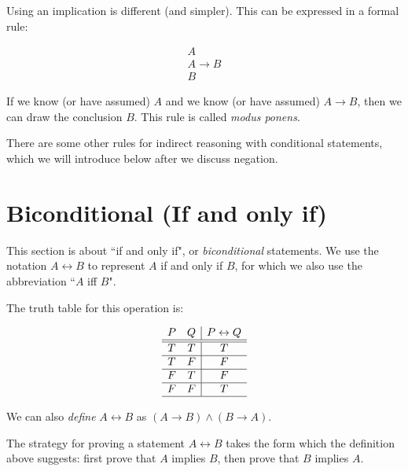 \documentclass[12pt]{article}
\begin{document}
Using an implication is different (and simpler).  This can be expressed in a formal rule:


$$\begin{array}{c}

A \\

A \rightarrow B \\ \hline

B

\end{array}$$


If we know (or have assumed) $A$ and we know (or have assumed) $A \rightarrow B$, then we can draw the conclusion $B$.  This rule is called {\em modus ponens\/}.

There are some other rules for indirect reasoning with conditional statements, which we will introduce below after we discuss negation.

\newpage

\section{Biconditional (If and only if)}

This section is about ``if and only if", or {\em biconditional\/} statements.  We use the notation $A \leftrightarrow B$ to represent $A$ if and only if $B$, for which we also use the abbreviation ``$A$ iff $B$".

The truth table for this operation is:

$$\begin{array}{cc|c}

P & Q & P \leftrightarrow Q \\ \hline \hline

T & T & T \\ \hline
T & F & F \\ \hline
F & T & F \\ \hline
F & F & T \\ \hline

\end{array}$$

We can also {\em define\/} $A \leftrightarrow B$ as $(A \rightarrow B) \wedge (B \rightarrow A)$.

The strategy for proving a statement $A \leftrightarrow B$ takes the form which the definition above suggests:  first prove that $A$ implies $B$, then prove that $B$ implies $A$.
\end{document}
